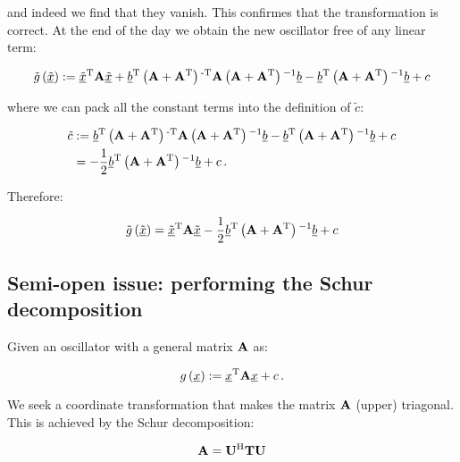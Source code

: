 \documentclass[a4paper,10pt]{article}
\begin{document}
and indeed we find that they vanish. This confirmes that the
transformation is correct. At the end of the day we obtain the
new oscillator free of any linear term:

\begin{equation}
  \tilde{g}\left(\underline{\tilde{x}}\right) :=
  \underline{\tilde{x}}{}^{\textnormal{T}} \mathbf{A} \underline{\tilde{x}}
  + \underline{b}{}^{\textnormal{T}} \left(\mathbf{A} + \mathbf{A}{}^{\textnormal{T}}\right){}^{\textnormal{-T}} \mathbf{A} \left(\mathbf{A} + \mathbf{A}{}^{\textnormal{T}}\right){}^{-1} \underline{b}
  - \underline{b}{}^{\textnormal{T}} \left(\mathbf{A} + \mathbf{A}{}^{\textnormal{T}}\right){}^{-1} \underline{b}
  + c
\end{equation}

where we can pack all the constant terms into the definition of $\tilde{c}$:

\begin{equation}
\begin{split}
  \tilde{c} & :=
              \underline{b}{}^{\textnormal{T}} \left(\mathbf{A} + \mathbf{A}{}^{\textnormal{T}}\right){}^{\textnormal{-T}} \mathbf{A} \left(\mathbf{A} + \mathbf{A}{}^{\textnormal{T}}\right){}^{-1} \underline{b}
            - \underline{b}{}^{\textnormal{T}} \left(\mathbf{A} + \mathbf{A}{}^{\textnormal{T}}\right){}^{-1} \underline{b}
            + c \\
            & =
            -\frac{1}{2} \underline{b}{}^{\textnormal{T}} \left(\mathbf{A} + \mathbf{A}{}^{\textnormal{T}}\right){}^{-1} \underline{b} + c \,.
\end{split}
\end{equation}

Therefore:

\begin{equation}
  \tilde{g}\left(\underline{\tilde{x}}\right) = \underline{\tilde{x}}{}^{\textnormal{T}} \mathbf{A} \underline{\tilde{x}}
                                        -\frac{1}{2} \underline{b}{}^{\textnormal{T}} \left(\mathbf{A} + \mathbf{A}{}^{\textnormal{T}}\right){}^{-1} \underline{b} + c
\end{equation}


\subsection{Semi-open issue: performing the Schur decomposition}


Given an oscillator with a general matrix $\mathbf{A}$ as:

\begin{equation}
  g\left(\underline{x}\right) := \underline{x}{}^{\textnormal{T}} \mathbf{A} \underline{x} + c \,.
\end{equation}

We seek a coordinate transformation that makes the matrix $\mathbf{A}$
(upper) triagonal. This is achieved by the Schur decomposition:

\begin{equation}
 \mathbf{A} = \mathbf{U}{}^{\textnormal{H}} \mathbf{T} \mathbf{U}
\end{equation}
\end{document}
